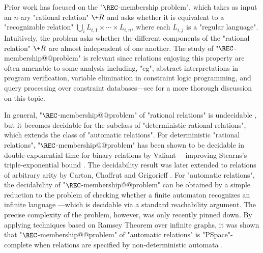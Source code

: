 Prior work has focused on the "$\REC$-membership problem", 
which takes as input an $n$-ary "rational relation"
$\+R$ and asks whether it is equivalent to a "recognizable relation"
$\bigcup_i L_{i,1} \times \cdots \times L_{i,n}$, where each $L_{i,j}$ is a "regular language". 
Intuitively, the problem asks whether the different components of  
the "rational relation" $\+R$ are almost independent of one another.
The study of "$\REC$-membership@@problem"
is relevant since relations enjoying this property are often amenable to some analysis including,
"eg", abstract interpretations in program verification, variable elimination in constraint logic 
programming, and query processing over constraint databases---see \cite[Introduction]{BarceloHongLeLinNiskanen2019MonadicDecomposability} for a more thorough discussion on this topic.

In general, "$\REC$-membership@@problem" of "rational relations" is undecidable
\cite[\S~III, Theorem~8.4]{Berstel1979Transductions},
but it becomes decidable  for the subclass of 
"deterministic rational relations", which extends the class of "automatic relations".
For deterministic "rational relations",  "$\REC$-membership@@problem" has been shown to be decidable in 
double-exponential time for binary relations
by Valiant \cite{Valiant1975RegularityDeterministicPushdown}---improving Stearns's
triple-exponential bound \cite{Stearns1967RegularityPushdown}.
The decidability result was later extended to relations of arbitrary arity by Carton, Choffrut and 
Grigorieff \cite[Theorem 3.7]{CartonChoffrutGrigorieff2006DecisionProblems}.
For "automatic relations", the decidability of "$\REC$-membership@@problem"
can be obtained by a  simple reduction to the problem of checking whether a finite automaton 
recognizes an infinite language \cite{LodingSpinrath2019DecisionProblems}---which is decidable via 
a standard reachability argument. 
The precise complexity of the problem, however, was only recently pinned down.
By applying techniques based on Ramsey Theorem over infinite graphs, it was shown that 
"$\REC$-membership@@problem" of "automatic relations" is 
"PSpace"-complete when relations are specified by non-deterministic automata
\cite[Theorem 1]{BarceloHongLeLinNiskanen2019MonadicDecomposability} \cite[Corollary 2.9]{BergstrasserGanardiLinZetzsche2022RamseyQuantifiers}.

